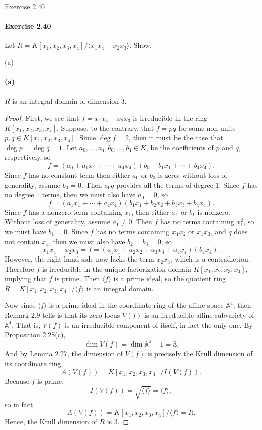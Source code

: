 \documentclass[12pt]{article}
\newenvironment{fullbox}{\begin{lrbox}{\savefullbox}\begin{minipage}{\dimexpr\textwidth-2\fboxsep\relax}}{\end{minipage}\end{lrbox}\begin{center}\framebox[\textwidth]{\usebox{\savefullbox}}\end{center}}
\newenvironment{pbox}[1][]{\begin{fullbox}\ifx#1\empty\else\paragraph{#1}\fi}{\end{fullbox}}
\theoremstyle{definition}
\newcommand{\<}{\langle}
\renewcommand{\>}{\rangle}
\newcommand{\A}{\mathbb{A}}
\begin{document}
\newpage
\begin{pbox}[Exercise 2.40]
    Let $R = K[x_1, x_2, x_3, x_4]/\<x_1x_4 - x_2x_3\>$. Show:
\end{pbox}

\begin{pbox}[(a)]
    $R$ is an integral domain of dimension $3$.
\end{pbox}

\begin{proof}
    First, we see that $f = x_1x_4 - x_2x_3$ is irreducible in the ring $K[x_1, x_2, x_3, x_4]$. Suppose, to the contrary, that $f = pq$ for some non-units $p, q \in K[x_1, x_2, x_3, x_4]$. Since $\deg f = 2$, then it must be the case that $\deg p = \deg q = 1$. Let $a_0, \dots, a_4, b_0, \dots, b_4 \in K$, be the coefficients of $p$ and $q$, respectively, so
    \[
        f = (a_0 + a_1x_1 + \cdots + a_4x_4)(b_0 + b_1x_1 + \cdots + b_4x_4).
    \]
    Since $f$ has no constant term then either $a_0$ or $b_0$ is zero; without loss of generality, assume $b_0 = 0$. Then $a_0q$ provides all the terms of degree $1$. Since $f$ has no degree $1$ terms, then we must also have $a_0 = 0$, so
    \[
        f = (a_1x_1 + \cdots + a_4x_4)(b_1x_1 + b_2x_2 + b_3x_3 + b_4x_4).
    \]
    Since $f$ has a nonzero term containing $x_1$, then either $a_1$ or $b_1$ is nonzero. Without loss of generality, assume $a_1 \ne 0$. Then $f$ has no terms containing $x_1^2$, so we must have $b_1 = 0$. Since $f$ has no terms containing $x_1x_2$ or $x_1x_3$, and $q$ does not contain $x_1$, then we must also have $b_2 = b_3 = 0$, so
    \[
        x_1x_4 - x_2x_3 = f = (a_1x_1 + a_2x_2 + a_3x_3 + a_4x_4)(b_4x_4).
    \]
    However, the right-hand side now lacks the term $x_2x_3$, which is a contradiction. Therefore $f$ is irreducible in the unique factorization domain $K[x_1, x_2, x_3, x_4]$, implying that $f$ is prime. Then $\<f\>$ is a prime ideal, so the quotient ring $R = K[x_1, x_2, x_3, x_4]/\<f\>$ is an integral domain.
    
    Now since $\<f\>$ is a prime ideal in the coordinate ring of the affine space $\A^4$, then Remark 2.9 tells is that its zero locus $V(f)$ is an irreducible affine subvariety of $\A^4$. That is, $V(f)$ is an irreducible component of itself, in fact the only one. By Proposition 2.28(c),
    \[
        \dim V(f) = \dim \A^4 - 1 = 3.
    \]
    And by Lemma 2.27, the dimension of $V(f)$ is precisely the Krull dimension of its coordinate ring,
    \[
        A(V(f)) = K[x_1, x_2, x_3, x_4]/I(V(f)).
    \]
    Because $f$ is prime,
    \[
        I(V(f)) = \sqrt{\<f\>} = \<f\>,
    \]
    so in fact
    \[
        A(V(f)) = K[x_1, x_2, x_3, x_4]/\<f\> = R.
    \]
    Hence, the Krull dimension of $R$ is $3$.

\end{proof}
\end{document}
